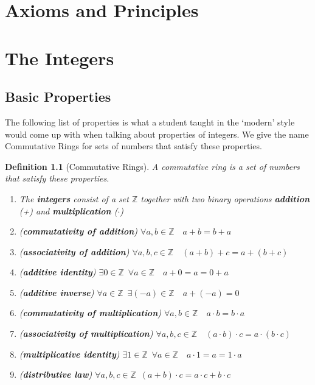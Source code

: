 \documentclass[11pt, oneside]{book}
\theoremstyle{break}
\newtheorem{defn}{Definition}[section]
\newcommand{\bb}[1]{\mathbb{#1}}			%
\begin{document}
\chapter*{Axioms and Principles}

\chapter{The Integers}

\section{Basic Properties}

The following list of properties is what a student taught in the `modern' style would come up with when talking about properties of integers. We give the name Commutative Rings for sets of numbers that satisfy these properties.

\begin{defn}[Commutative Rings]\label{defn-commutative-rings}
	A commutative ring is a set of numbers that satisfy these properties.
	\begin{enumerate}
		\item The \textbf{integers} consist of a set $\bb{Z}$ together with two binary operations \textbf{addition} (+) and \textbf{multiplication} ($\cdot$)
		\item (\textbf{commutativity of addition}) $\forall a, b \in \bb{Z} \quad a + b = b + a$
		\item (\textbf{associativity of addition}) $\forall a, b, c \in \bb{Z} \quad (a + b) + c = a + (b + c)$
		\item (\textbf{additive identity}) $\exists 0 \in \bb{Z} \enspace \forall a \in \bb{Z} \quad a + 0 = a = 0 + a$
		\item (\textbf{additive inverse}) $\forall a \in \bb{Z} \enspace \exists (-a) \in \bb{Z} \quad a + (-a) = 0$
		\item (\textbf{commutativity of multiplication}) $\forall a, b \in \bb{Z} \quad a \cdot b = b \cdot a$
		\item (\textbf{associativity of multiplication}) $\forall a, b, c \in \bb{Z} \quad (a \cdot b) \cdot c = a \cdot (b \cdot c)$
		\item (\textbf{multiplicative identity}) $\exists 1 \in \bb{Z} \enspace \forall a \in \bb{Z} \quad a \cdot 1 = a = 1 \cdot a$
		\item (\textbf{distributive law}) $\forall a, b, c \in \bb{Z} \enspace (a + b) \cdot c = a \cdot c + b \cdot c$
	\end{enumerate}
\end{defn}
\end{document}
